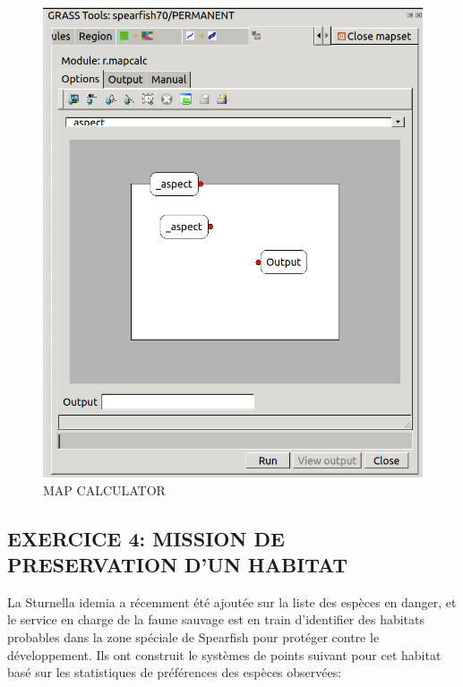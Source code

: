 \begin{figure}[htbp]
   \centering
   \includegraphics[scale=0.2]{grass016.png}
   \caption{MAP CALCULATOR}
   \label{fig:grass016}
\end{figure}

\subsection{EXERCICE 4: MISSION DE PRESERVATION D'UN HABITAT}
La Sturnella idemia a r\'ecemment \'et\'e ajout\'ee sur la liste des esp\`eces en danger, et le service en charge de la faune sauvage est en train d'identifier des habitats probables dans la zone sp\'eciale de Spearfish pour prot\'eger contre le d\'eveloppement. Ils ont construit le syst\`emes de points suivant pour cet habitat bas\'e sur les statistiques de pr\'ef\'erences des esp\`eces observ\'ees:

